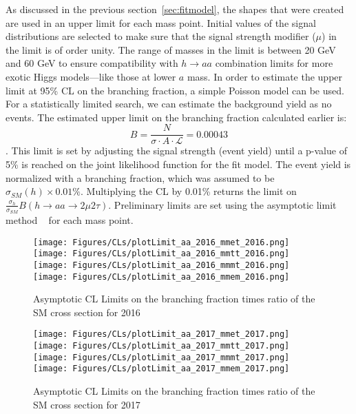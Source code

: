As discussed in the previous section~\ref{sec:fitmodel}, the shapes that were created are used in an upper limit for each mass point. 
Initial values of the signal distributions are selected to make sure that the signal strength modifier ($\mu$) in the limit is of order unity. 
The range of masses in the limit is between 20 GeV and 60 GeV to ensure compatibility with $h \rightarrow a a $ combination limits for more exotic Higgs models---like those at lower $a$ mass. 
In order to estimate the upper limit at 95\% CL on the branching fraction, a simple Poisson model can be used. For a statistically limited search, we can estimate the background yield as no events. The estimated upper limit on the branching fraction calculated earlier is: 
\begin{equation}B =  \frac{N}{\sigma \cdot A\cdot \mathcal{L}} = 0.00043\end{equation}. 
This limit is set by adjusting the signal strength (event yield) until a p-value of 5\% is reached on the joint likelihood function for the fit model. 
The event yield is normalized with a branching fraction, which was assumed to be $\sigma_{SM}(h) \times 0.01\%$.
Multiplying the CL by 0.01\% returns the limit on $\frac{\sigma_h}{\sigma_{SM}} B(h\rightarrow aa\rightarrow2\mu2\tau)$.
Preliminary limits are set using the asymptotic limit method ~\cite{Cowan_2011} for each mass point.


\begin{figure}[ht!b]
  \centering
  \texttt{[image: Figures/CLs/plotLimit\_aa\_2016\_mmet\_2016.png]}
  \texttt{[image: Figures/CLs/plotLimit\_aa\_2016\_mmtt\_2016.png]}\\
  \texttt{[image: Figures/CLs/plotLimit\_aa\_2016\_mmmt\_2016.png]}
  \texttt{[image: Figures/CLs/plotLimit\_aa\_2016\_mmem\_2016.png]}\\
    \caption{\label{fig:CLs2016} Asymptotic CL Limits on the branching fraction times ratio of the SM cross section for 2016}
\end{figure}

\begin{figure}[ht!b]
  \centering
  \texttt{[image: Figures/CLs/plotLimit\_aa\_2017\_mmet\_2017.png]}
  \texttt{[image: Figures/CLs/plotLimit\_aa\_2017\_mmtt\_2017.png]}\\
  \texttt{[image: Figures/CLs/plotLimit\_aa\_2017\_mmmt\_2017.png]}
  \texttt{[image: Figures/CLs/plotLimit\_aa\_2017\_mmem\_2017.png]}\\
    \caption{\label{fig:CLs2017} Asymptotic CL Limits on the branching fraction times ratio of the SM cross section for 2017}
\end{figure}

